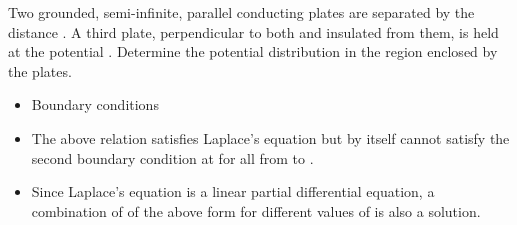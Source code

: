 
\begin{ELexample}{}

Two grounded, semi-infinite, parallel conducting plates are separated by the distance . A third plate, perpendicular to both and insulated from them, is held at the potential . Determine the potential distribution in the region enclosed by the plates.


\begin{ELsolution}

\begin{itemize}
\tightlist
\item
  Boundary conditions
\end{itemize}



\begin{itemize}
\tightlist
\item
  The above relation satisfies Laplace's equation but by itself cannot satisfy the second boundary condition at  for all  from  to .
\item
  Since Laplace's equation is a linear partial differential equation, a combination of  of the above form for different values of  is also a solution.
\end{itemize}


\end{ELsolution}
\end{ELexample}
